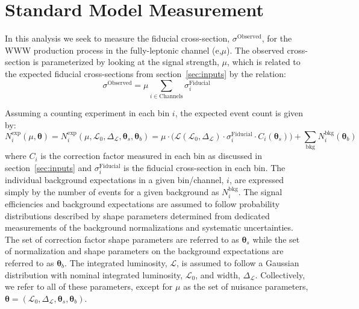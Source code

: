 

\section{Standard Model Measurement}
\label{sec:measurement}
\newcommand*\Diff[1]{\mathop{}\!\mathrm{d}#1~}
\newcommand{\boldtheta}{\boldsymbol{\theta}}
\newcommand{\thetas}{\boldsymbol{\theta}_s}
\newcommand{\thetab}{\boldsymbol{\theta}_b}
\newcommand{\curlyl}{\mathcal{L}}

In this analysis we seek to measure the 
fiducial cross-section, $\sigma^{\textrm{Observed}}$, for the 
WWW production process in the fully-leptonic channel (e,$\mu$).
The observed cross-section is parameterized by looking at the signal
strength, $\mu$, which is related to the expected fiducial cross-sections
from section~\ref{sec:inputs} by the relation:
\begin{equation}
\sigma^{\textrm{Observed}} = \mu \sum_{i\in \textrm{Channels}} \sigma^{\textrm{Fiducial}}_i
\end{equation}

Assuming a counting experiment in each bin $i$, the expected 
event count is given by:
\begin{equation}
N^{\mathrm{exp}}_i(\mu,\boldtheta) = N^{\mathrm{exp}}_i(\mu,\curlyl_0,\Delta_{\curlyl},\thetas,\thetab) = \mu \cdot \bigg( \curlyl(\curlyl_0,\Delta_{\curlyl}) \cdot \sigma^{\mathrm{Fiducial}}_i \cdot C_i(\thetas) \bigg) + \sum_{\mathrm{bkg}} N_{i}^{\mathrm{bkg}}(\thetab)
\label{eq:poisson_expectation}
\end{equation}
where $C_i$ is the correction factor 
measured in each bin as discussed in section~\ref{sec:inputs} and 
$\sigma^{\mathrm{Fiducial}}_i$ is the fiducial cross-section in each 
bin. The 
individual background expectations in a given bin/channel, $i$, are 
expressed simply by the number of events
for a given background as $N^{\mathrm{bkg}}_i$. 
The signal efficiencies and background expectations are assumed to follow 
probability distributions described by shape parameters determined from 
dedicated measurements of the background normalizations and systematic 
uncertainties.  
The set of correction factor shape parameters are referred to 
as $\thetas$ while the set of normalization and shape parameters on 
the background expectations are referred to as $\thetab$.
The integrated luminosity, $\curlyl$, is assumed to follow 
a Gaussian distribution with nominal integrated 
luminosity, $\curlyl_0$, and width, $\Delta_{\curlyl}$. 
Collectively, we refer to all of these parameters, except 
for $\mu$ as the set of nuisance 
parameters, $\boldtheta = (\curlyl_0,\Delta_{\curlyl}, \thetas, \thetab)$. 

